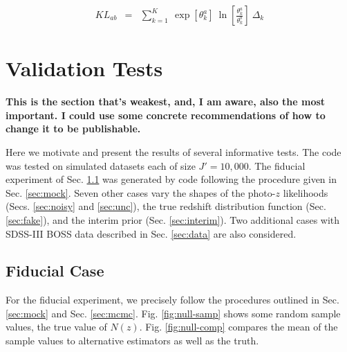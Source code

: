 \documentclass[preprint]{aastex}
\begin{document}
\begin{eqnarray}
\label{eq:kl}
KL_{ab} &=& \sum_{k=1}^{K}\ \exp[\theta_{k}^{a}]\ 
\ln\left[\frac{\theta_{k}^{a}}{\theta_{k}^{b}}\right]\ \Delta_{k}
\end{eqnarray}

\clearpage
\section{Validation Tests}
\label{sec:valid}

\textbf{This is the section that's weakest, and, I am aware, also the most 
important.  I could use some concrete recommendations of how to change it to be 
publishable.}

Here we motivate and present the results of several informative tests.  The 
code was tested on simulated datasets each of size $J'=10,000$.  The fiducial 
experiment of Sec. \ref{sec:null} was generated by code following the procedure 
given in Sec. \ref{sec:mock}.  Seven other cases vary the shapes of the 
photo-$z$ likelihoods (Secs. \ref{sec:noisy} and \ref{sec:unc}), the true 
redshift distribution function (Sec. \ref{sec:fake}), and the interim prior 
(Sec. \ref{sec:interim}).  Two additional cases with SDSS-III BOSS data 
described in Sec. \ref{sec:data} are also considered.

\clearpage
\subsection{Fiducial Case}
\label{sec:null}

For the fiducial experiment, we precisely follow the procedures outlined in 
Sec. \ref{sec:mock} and Sec. \ref{sec:mcmc}.  Fig. \ref{fig:null-samp} shows 
some random sample values, the true value of $N(z)$.  Fig. \ref{fig:null-comp} 
compares the mean of the sample values to alternative estimators as well as the 
truth.
\end{document}
